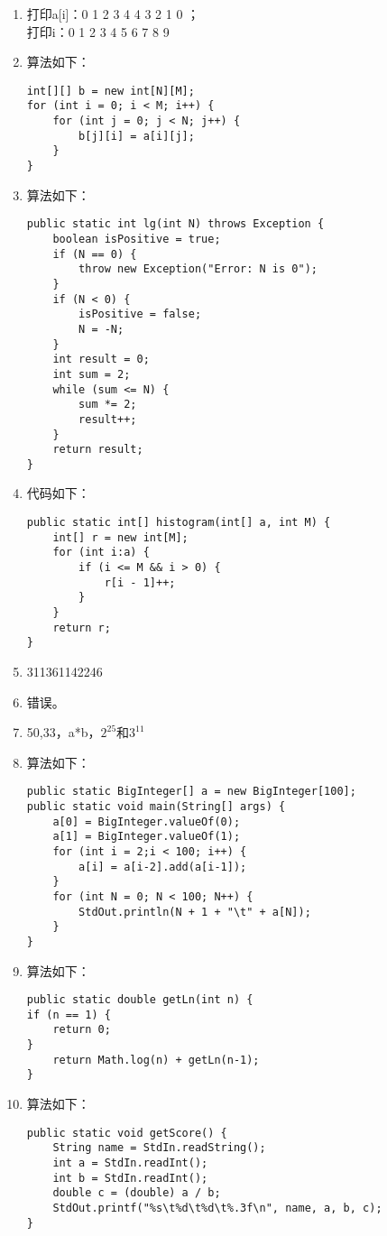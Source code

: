\begin{enumerate}
\begin{lstlisting}
	}
	StdOut.print("\n");
}
	\end{lstlisting}
	\item 打印a[i]：0 1 2 3 4 4 3 2 1 0 ；
	\\打印i：0 1 2 3 4 5 6 7 8 9 
	\item 算法如下：
	\begin{lstlisting}
int[][] b = new int[N][M];
for (int i = 0; i < M; i++) {
	for (int j = 0; j < N; j++) {
		b[j][i] = a[i][j];
	}
}
	\end{lstlisting}
	\item 算法如下：
	\begin{lstlisting}
public static int lg(int N) throws Exception {
	boolean isPositive = true;
	if (N == 0) {
		throw new Exception("Error: N is 0");
	}
	if (N < 0) {
		isPositive = false;
		N = -N;
	}
	int result = 0;
	int sum = 2;
	while (sum <= N) {
		sum *= 2;
		result++;
	}
	return result;
}
	\end{lstlisting}
	\item 代码如下：
	\begin{lstlisting}
public static int[] histogram(int[] a, int M) {
	int[] r = new int[M];
	for (int i:a) {
		if (i <= M && i > 0) {
			r[i - 1]++;
		}
	}
	return r;
}
	\end{lstlisting}
	\item 311361142246
	\item 错误。
	\item 50,33，a*b，$2^{25}$和$3^{11}$
	\item 算法如下：
	\begin{lstlisting}
public static BigInteger[] a = new BigInteger[100];
public static void main(String[] args) {
	a[0] = BigInteger.valueOf(0);
	a[1] = BigInteger.valueOf(1);
	for (int i = 2;i < 100; i++) {
		a[i] = a[i-2].add(a[i-1]);
	}
	for (int N = 0; N < 100; N++) {
		StdOut.println(N + 1 + "\t" + a[N]);
	}
}
	\end{lstlisting}
	\item 算法如下：
	\begin{lstlisting}
public static double getLn(int n) {
if (n == 1) {
	return 0;
}
	return Math.log(n) + getLn(n-1);
}
	\end{lstlisting}
	\item 算法如下：
	\begin{lstlisting}
public static void getScore() {
	String name = StdIn.readString();
	int a = StdIn.readInt();
	int b = StdIn.readInt();
	double c = (double) a / b;
	StdOut.printf("%s\t%d\t%d\t%.3f\n", name, a, b, c);
}
	\end{lstlisting}

\end{enumerate}
